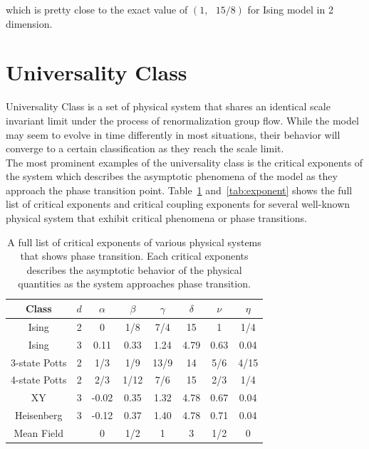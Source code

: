 \documentclass[%
 reprint,
 amsmath,amssymb,
 aps,
]{revtex4-2}
\begin{document}
which is pretty close to the exact value of $(1, \text{ } 15/8)$ for Ising model 
in 2 dimension.\\

\section{\label{appx:universal}Universality Class}
Universality Class is a set of physical system that shares an identical scale invariant 
limit under the process of renormalization group flow. While the model may seem to evolve 
in time differently in most situations, their behavior will converge to a certain 
classification as they reach the scale limit. \\

The most prominent examples of the universality class is the critical exponents of the 
system which describes the asymptotic phenomena of the model as they approach the phase 
transition point. Table~\ref{tab:universality} and~\ref{tab:exponent} shows the full list 
of critical exponents and critical coupling exponents for several well-known physical 
system that exhibit critical phenomena or phase transitions. \\ 

\begin{table}[b]
\caption{\label{tab:universality}
A full list of critical exponents of various physical systems that shows phase transition. 
Each critical exponents describes the asymptotic behavior of the physical quantities as the 
system approaches phase transition.}
\begin{ruledtabular}
\begin{tabular}{cccccccc}
Class &$d$ &$\alpha$ &$\beta $&$\gamma $&
$\delta$ &$\nu$ &$\eta$ \\
\hline
Ising & 2 & 0 & 1/8 & 7/4
& 15 & 1 & 1/4 \\
Ising & 3 & 0.11 & 0.33 & 1.24
& 4.79 & 0.63 & 0.04 \\
3-state Potts & 2 & 1/3 & 1/9 & 13/9
& 14 & 5/6 & 4/15 \\
4-state Potts & 2 & 2/3 & 1/12 & 7/6
& 15 & 2/3 & 1/4 \\
XY & 3 & -0.02 & 0.35 & 1.32
& 4.78 & 0.67 & 0.04 \\
Heisenberg & 3 & -0.12 & 0.37 & 1.40
& 4.78 & 0.71 & 0.04 \\
Mean Field &  & 0 & 1/2 & 1
& 3 & 1/2 & 0 \\
\end{tabular}
\end{ruledtabular}
\end{table}
\end{document}

